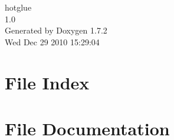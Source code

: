 \documentclass[a4paper]{book}
\begin{document}
\hypersetup{pageanchor=false}
\begin{titlepage}
\vspace*{7cm}
\begin{center}
{\Large hotglue \\[1ex]\large 1.0 }\\
\vspace*{1cm}
{\large Generated by Doxygen 1.7.2}\\
\vspace*{0.5cm}
{\small Wed Dec 29 2010 15:29:04}\\
\end{center}
\end{titlepage}
\clearemptydoublepage
{}
\tableofcontents
\clearemptydoublepage
{}
\hypersetup{pageanchor=true}
\chapter{File Index}

\chapter{File Documentation}























\printindex
\end{document}
